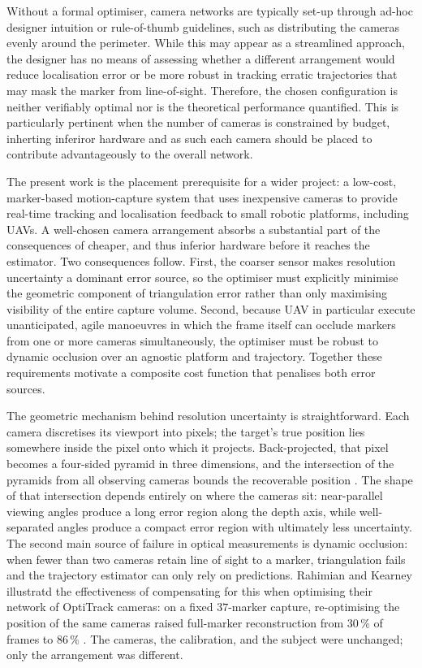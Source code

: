 \documentclass[conference]{IEEEtran}
\begin{document}
Without a formal optimiser, camera networks are typically set-up through ad-hoc designer intuition or rule-of-thumb  guidelines, such as distributing the cameras evenly around the perimeter. While this may appear as a streamlined approach, the designer has no means of assessing whether a different arrangement would reduce localisation error or be more robust in tracking erratic trajectories that may mask the marker from line-of-sight. Therefore, the chosen configuration is neither verifiably optimal nor is the theoretical performance quantified. This is particularly pertinent when the number of cameras is constrained by budget, inherting inferiror hardware and as such each camera should be placed to contribute advantageously to the overall network.

The present work is the placement prerequisite for a wider project: a low-cost, marker-based motion-capture system that uses inexpensive
cameras to provide real-time tracking and localisation feedback to small robotic platforms, including \glspl{UAV}. A well-chosen camera arrangement absorbs a substantial part of the consequences of cheaper, and thus inferior hardware before it reaches the estimator. Two consequences follow. First, the coarser sensor makes resolution uncertainty a dominant error source, so the optimiser must explicitly minimise the geometric component of triangulation error rather than only maximising visibility of the entire capture volume. Second, because \gls{UAV} in particular execute unanticipated, agile manoeuvres in which the frame itself can occlude markers from one or more cameras simultaneously, the optimiser must be robust to dynamic occlusion over an agnostic platform and trajectory. Together these requirements motivate a composite cost function that penalises both error sources.

The geometric mechanism behind resolution uncertainty is straightforward. Each camera discretises its viewport into pixels; the target's true position lies somewhere inside the pixel onto which it projects. Back-projected, that pixel becomes a four-sided pyramid in three dimensions, and the intersection of the pyramids from all observing cameras bounds the recoverable position \cite{sharma_analysis_1998}. The shape of that intersection depends entirely on where the cameras sit: near-parallel viewing angles produce a long error region along the depth axis, while well-separated angles produce a compact error region with ultimately less uncertainty. The second main source of failure in optical measurements is dynamic occlusion: when fewer than two cameras retain line of sight to a marker, triangulation fails and the trajectory estimator can only rely on predictions. Rahimian and Kearney illustratd the effectiveness of compensating for this when optimising their network of OptiTrack cameras: on a fixed $37$-marker capture, re-optimising the position of the same cameras
raised full-marker reconstruction from $30\,\%$ of frames to $86\,\%$ \cite{rahimian_optimal_2017}. The cameras, the calibration,
and the subject were unchanged; only the arrangement was different.
\end{document}

